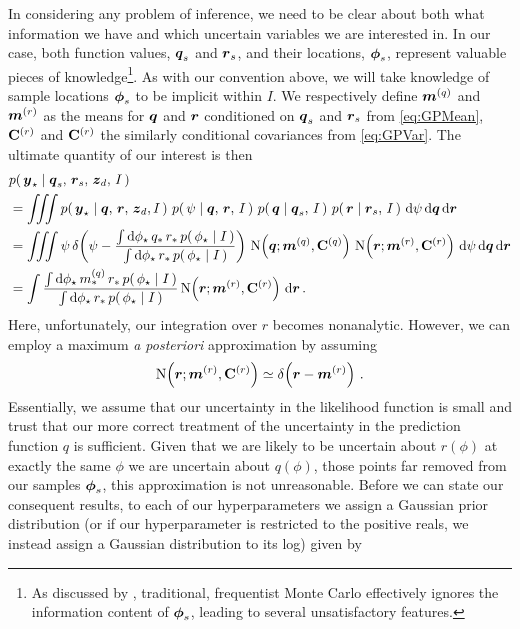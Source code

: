 \documentclass{acmsmall}
\begin{document}
In considering any problem of inference, we need to be clear about both what information we have and which uncertain variables we are interested in. In our case, both function values, $\boldsymbol{q}_s$ and $\boldsymbol{r}_s$, and their locations, $\boldsymbol{\phi}_s$, represent valuable pieces of knowledge\footnote{As discussed by , traditional, frequentist Monte Carlo effectively ignores the information content of $\boldsymbol{\phi}_s$, leading to several unsatisfactory features.}. As with our convention above, we will take knowledge of sample locations $\boldsymbol{\phi}_s$ to be implicit within $I$. We respectively define $\boldsymbol{m}^{(q)}$ and $\boldsymbol{m}^{(r)}$ as the means for $\boldsymbol{q}$ and $\boldsymbol{r}$ conditioned on $\boldsymbol{q}_s$ and $\boldsymbol{r}_s$ from \eqref{eq:GPMean}, $\mathbf{C}^{(r)}$ and $\mathbf{C}^{(r)}$ the similarly conditional covariances from \eqref{eq:GPVar}. The ultimate quantity of our interest is then
\begin{align}
&\p{\vyst}{\vect{q}_s,\,\vect{r}_s,\,\vzD,\,I} \nonumber\\  
& = \iiint \p{\vyst}{\vect{q},\,\vect{r},\,\vzD,I}\,\p{\psi}{\vect{q},\,\vect{r},\,I}\,\p{\vect{q}}{\vect{q}_s,\,I}\,\p{\vect{r}}{\vect{r}_s,\,I}\,\ud\psi\, \ud \vect{q}\,\ud \vect{r} \nonumber\\
& = \iiint \psi\,\dd{\psi}{\frac{\int \ud\phst\,q_\ast\,r_\ast\,\p{\phst}{I}}
{\int \ud\phst\,r_\ast\,\p{\phst}{I}}}\, \N{\vect{q}}{\vect{m}^{(q)}}{\mat{C}^{(q)}}\, \N{\vect{r}}{\vect{m}^{(r)}}{\mat{C}^{(r)}}\,\ud\psi\, \ud \vect{q}\,\ud \vect{r} \nonumber \\
& = \int \frac{\int \ud\phst\,m^{(q)}_\ast\,r_\ast\,\p{\phst}{I}}
{\int \ud\phst\,r_\ast\,\p{\phst}{I}}\, \N{\vect{r}}{\vect{m}^{(r)}}{\mat{C}^{(r)}}\,\ud \vect{r}\,.
\end{align}
Here, unfortunately, our integration over $r$ becomes nonanalytic. However, we can employ a maximum {\it a posteriori} approximation by assuming
$$
\N{\vect{r}}{\vect{m}^{(r)}}{\mat{C}^{(r)}} \simeq \dd{\vect{r}}{\vect{m}^{(r)}}\,.
$$
Essentially, we assume that our uncertainty in the likelihood function is small and trust that our more correct treatment of the uncertainty in the prediction function $q$ is sufficient. Given that we are likely to be uncertain about $r(\phi)$ at exactly the same $\phi$ we are uncertain about $q(\phi)$, those points far removed from our samples $\boldsymbol{\phi}_s$, this approximation is not unreasonable.  Before we can state our consequent results, to each of our hyperparameters we assign a Gaussian prior distribution (or if our hyperparameter is restricted to the positive reals, we instead assign a Gaussian distribution to its log) given by
\end{document}
